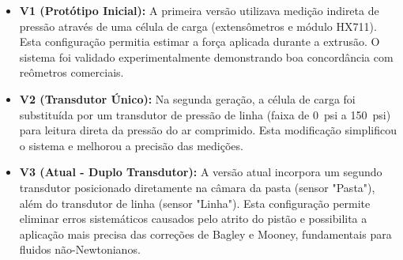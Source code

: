 \documentclass[a4paper,12pt]{article}
\begin{document}
\begin{itemize}
  \item \textbf{V1 (Protótipo Inicial):} A primeira versão utilizava medição indireta de pressão através de uma célula de carga (extensômetros e módulo HX711). Esta configuração permitia estimar a força aplicada durante a extrusão. O sistema foi validado experimentalmente demonstrando boa concordância com reômetros comerciais.
  
  \item \textbf{V2 (Transdutor Único):} Na segunda geração, a célula de carga foi substituída por um transdutor de pressão de linha (faixa de \SI{0}{psi} a \SI{150}{psi}) para leitura direta da pressão do ar comprimido. Esta modificação simplificou o sistema e melhorou a precisão das medições.
  
  \item \textbf{V3 (Atual - Duplo Transdutor):} A versão atual incorpora um segundo transdutor posicionado diretamente na câmara da pasta (sensor "Pasta"), além do transdutor de linha (sensor "Linha"). Esta configuração permite eliminar erros sistemáticos causados pelo atrito do pistão e possibilita a aplicação mais precisa das correções de Bagley e Mooney, fundamentais para fluidos não-Newtonianos.
\end{itemize}
\end{document}
